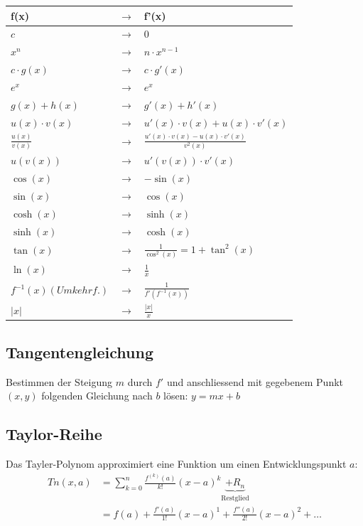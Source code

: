 {\setlength{\extrarowheight}{4pt}
\begin{tabular}{@{}lcl@{}}
	\textbf{f(x)} & $\rightarrow$ & \textbf{f'(x)} \\
	\toprule
	$c$ & $\rightarrow$ & $0$ \\
	$x^n$  & $\rightarrow$ & $n\cdot x^{n-1}$ \\
	$c\cdot g\left(x\right)$  & $\rightarrow$ & $c\cdot g'\left(x\right)$ \\
	$e^x$  & $\rightarrow$ & $e^x$ \\
	\midrule
	$g\left(x\right)+h\left(x\right)$  & $\rightarrow$ & $g'\left(x\right)+h'\left(x\right)$ \\
	$u\left(x\right)\cdot v\left(x\right)$  & $\rightarrow$ & $u'\left(x\right)\cdot v\left(x\right)+u\left(x\right)\cdot v'\left(x\right)$ \\ 
	$\frac{u\left(x\right)}{v\left(x\right)}$  & $\rightarrow$ & $\frac{u'\left(x\right)\cdot v\left(x\right)-u\left(x\right)\cdot v'\left(x\right)}{v^2\left(x\right)}$ \\
	$u\left(v\left(x\right)\right)$  & $\rightarrow$ & $u'\left(v\left(x\right)\right)\cdot v'\left(x\right)$ \\
	\midrule
	$\cos\left(x\right)$ & $\rightarrow$ & $-\sin(x)$ \\
	$\sin\left(x\right)$ & $\rightarrow$ & $\cos(x)$ \\	
	$\cosh\left(x\right)$ & $\rightarrow$ & $\sinh(x)$ \\
	$\sinh\left(x\right)$ & $\rightarrow$ & $\cosh(x)$ \\
	$\tan\left(x\right)$ & $\rightarrow$ & $\frac{1}{\cos^2(x)} = 1 + \tan^2(x)$ \\	
	$\ln\left(x\right)$ & $\rightarrow$ & $\frac{1}{x}$ \\
	$f^{-1}\left(x\right) {\scriptscriptstyle (Umkehrf.)}$  & $\rightarrow$ & $\frac{1}{f'(f^{-1}(x))}$ \\
	$\left|x\right|$ & $\rightarrow$ & $\frac{\left|x\right|}{x}$ \\
\end{tabular}
}

\subsection{Tangentengleichung}
Bestimmen der Steigung $m$ durch $f'$ und anschliessend mit gegebenem Punkt $(x,y)$ folgenden Gleichung nach $b$ lösen:
$y = mx + b$

\subsection{Taylor-Reihe }
Das Tayler-Polynom approximiert eine Funktion um einen Entwicklungspunkt $a$:
\begin{align*}
	Tn(x, a) &= \sum\limits_{k = 0}^{n}\frac{f^{(k)}(a)}{k!}(x - a)^k \underbrace{+ R_n}_{\text{Restglied}}\\
	         &= f(a) + \frac{f'(a)}{1!}(x - a)^1 + \frac{f''(a)}{2!}(x - a)^2 + \dots
\end{align*}

